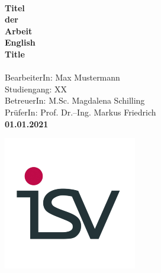 %
%
\begin{titlepage}
\begin{flushright}
  \vspace{10mm} 
         {\large \bf \hspace{13mm} \\}
  \vspace{10mm}
         {\Large \bf \hspace{20mm}Titel \\} 
         {\Large \bf \hspace{20mm}der\\}
         {\Large \bf \hspace{20mm}Arbeit\\}
  \vspace{5mm}
         {\large \bf \hspace{20mm}English\\} 
         {\large \bf \hspace{20mm}Title\\} 
  \vspace{20mm}
         {\\} %
  \vspace{50mm}
  		 {\small BearbeiterIn: Max Mustermann}\\ %
  		 {\small Studiengang: XX}\\
  \vspace{10mm}
  		 {\small BetreuerIn: M.Sc. Magdalena Schilling}\\ %
  		 {\small PrüferIn: Prof. Dr.--Ing. Markus Friedrich}\\ %
  \vspace{10mm}
         {\bf 01.01.2021}\\ %
  \vspace{20mm}
\end{flushright}
\begin{flushleft}
\begin{minipage}{0.2\textwidth}
	\begin{flushright}
	{\includegraphics[scale=0.35]{Pictures/ISV_logo_weiss.png}}\\

\end{flushright}
\end{minipage}
\end{flushleft}
\end{titlepage}
